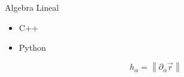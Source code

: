 \documentclass[10pt, aspectratio=169]{beamer}
\begin{document}
\begin{frame}{Algebra Lineal}
	
\begin{itemize}
	\item C++
	\item Python
\end{itemize}
\begin{equation*}
h_\alpha = \left\| \partial_\alpha \vec{r} \right\|
\end{equation*}
\end{frame}
\end{document}
